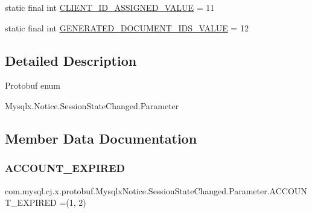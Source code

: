 \begin{DoxyCompactItemize}
\item 
static final int \mbox{\hyperlink{enumcom_1_1mysql_1_1cj_1_1x_1_1protobuf_1_1_mysqlx_notice_1_1_session_state_changed_1_1_parameter_a7877e0721f29e9087e15466fbef69f2f}{C\+L\+I\+E\+N\+T\+\_\+\+I\+D\+\_\+\+A\+S\+S\+I\+G\+N\+E\+D\+\_\+\+V\+A\+L\+UE}} = 11
\item 
static final int \mbox{\hyperlink{enumcom_1_1mysql_1_1cj_1_1x_1_1protobuf_1_1_mysqlx_notice_1_1_session_state_changed_1_1_parameter_a0cc5511cf0412d80fe321caca10bb108}{G\+E\+N\+E\+R\+A\+T\+E\+D\+\_\+\+D\+O\+C\+U\+M\+E\+N\+T\+\_\+\+I\+D\+S\+\_\+\+V\+A\+L\+UE}} = 12
\end{DoxyCompactItemize}


\subsection{Detailed Description}
Protobuf enum
\begin{DoxyCode}
Mysqlx.Notice.SessionStateChanged.Parameter 
\end{DoxyCode}
 

\subsection{Member Data Documentation}
\mbox{\label{enumcom_1_1mysql_1_1cj_1_1x_1_1protobuf_1_1_mysqlx_notice_1_1_session_state_changed_1_1_parameter_a5f84cbc99bdd8004cdc8264d7bbabd92}} 
\subsubsection{\texorpdfstring{A\+C\+C\+O\+U\+N\+T\+\_\+\+E\+X\+P\+I\+R\+ED}{ACCOUNT\_EXPIRED}}
{\footnotesize\ttfamily com.\+mysql.\+cj.\+x.\+protobuf.\+Mysqlx\+Notice.\+Session\+State\+Changed.\+Parameter.\+A\+C\+C\+O\+U\+N\+T\+\_\+\+E\+X\+P\+I\+R\+ED =(1, 2)}

